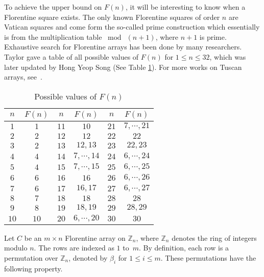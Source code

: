 \documentclass[conference,letterpaper]{IEEEtran}
\theoremstyle{definition}
\begin{document}
To achieve the upper bound on $F(n)$,  it will be interesting to know when a Florentine square exists. The only known Florentine squares of order $n$ are Vatican squares and come form the so-called prime construction which essentially is from the multiplication 
table $\bmod~(n+1)$, where $n+1$ is prime. 
Exhaustive search for Florentine arrays has been done by many researchers. 
Taylor \cite{TAYLOR1991} gave a table of all possible values of $F(n)$ for $1 \leq n \leq 32$, which was later updated by Hong Yeop Song \cite{HYSong} (See Table \ref{FAtable}). For more works on Tuscan arrays, see~\cite{GolombT, Colbourn}. 


\begin{table}[!h] 
	\centering
	\caption{Possible values of  $F(n)$  \cite{Colbourn}}
	\begin{tabular}{| c | c | c | c | c | c |}
		\hline $n$  & $F(n)$ & $n$  & $F(n)$ & $n$ & $F(n)$  \\
		\hline $1$  & $1$ & $11$  & $10$ & $21$ & $7, \cdots, 21$  \\
		\hline $2$  & $2$ & $12$ & $12$ & $22$ & $22$  \\
		\hline $3$  & $2$ & $13$  & $12,13$ & $23$ & $22,23$  \\
		\hline $4$  & $4$ & $14$  & $7, \cdots, 14$ & $24$ & $6, \cdots, 24$  \\
		\hline $5$  & $4$ & $15$  & $7, \cdots, 15$ & $25$ & $6, \cdots, 25$  \\
		\hline $6$  & $6$ & $16$  & $16$ & $26$ & $6, \cdots, 26$  \\
		\hline $7$  & $6$ & $17$  & $16,17$ & $27$ & $6, \cdots, 27$  \\
		\hline $8$  & $7$ & $18$  & $18$ & $28$ & $28$  \\
		\hline $9$  & $8$ & $19$  & $18, 19$ & $29$ & $28, 29$  \\
		\hline $10$  & $10$ & $20$  & $6, \cdots, 20$ & $30$ & $30$  \\		
		\hline
	\end{tabular}
	\label{FAtable}
\end{table}



Let $C$ be an $m \times n$  Florentine array on $\mathbb{Z}_{n}$, where  $\mathbb{Z}_{n}$ denotes the ring of integers modulo $n$. The rows are indexed as $1$ to~$m$.  By definition,  each row is a permutation over $\mathbb{Z}_{n}$, denoted by $\beta_i$ for $1 \leq i \leq m$. These permutations have the following property.
\end{document}
